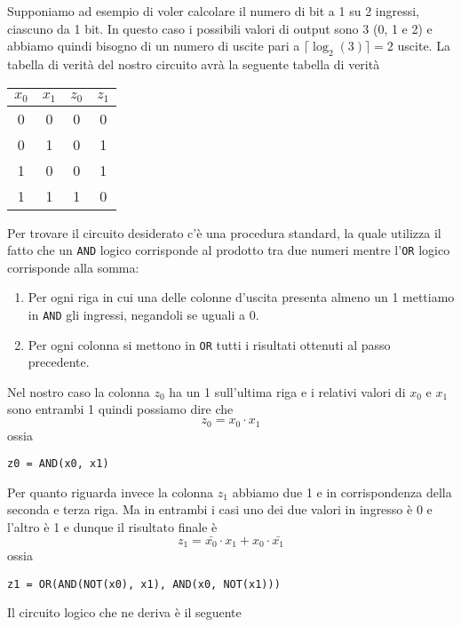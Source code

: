 Supponiamo ad esempio di voler calcolare il numero di bit a 1 su 2 ingressi, ciascuno da 1 bit. In
questo caso i possibili valori di output sono 3 (0, 1 e 2) e abbiamo quindi bisogno di un numero
di uscite pari a $\lceil \log_2 (3) \rceil = 2$ uscite. La tabella di verità del nostro circuito
avrà la seguente tabella di verità
\begin{center}
	\begin{tabular}{c c | c c}
		$x_0$ & $x_1$ & $z_0$ & $z_1$ \\ \hline
		0     & 0     & 0     & 0     \\
		0     & 1     & 0     & 1     \\
		1     & 0     & 0     & 1     \\
		1     & 1     & 1     & 0
	\end{tabular}
\end{center}
Per trovare il circuito desiderato c'è una procedura standard, la quale utilizza il fatto che un
\verb|AND| logico corrisponde al prodotto tra due numeri mentre l'\verb|OR| logico corrisponde alla
somma:
\begin{enumerate}
	\item Per ogni riga in cui una delle colonne d'uscita presenta almeno un 1 mettiamo in
	      \verb|AND| gli ingressi, negandoli se uguali a 0.
	\item Per ogni colonna si mettono in \verb|OR| tutti i risultati ottenuti al passo precedente.
\end{enumerate}
Nel nostro caso la colonna $z_0$ ha un 1 sull'ultima riga e i relativi valori di $x_0$ e $x_1$ sono
entrambi 1 quindi possiamo dire che
\[ z_0 = x_0 \cdot x_1 \]
ossia
\begin{center}
	\verb|z0 = AND(x0, x1)|
\end{center}
Per quanto riguarda invece la colonna $z_1$ abbiamo due 1 e in corrispondenza della seconda e terza
riga. Ma in entrambi i casi uno dei due valori in ingresso è 0 e l'altro è 1 e dunque il risultato
finale è
\[ z_1 = \bar{x_0} \cdot x_1 + x_0 \cdot \bar{x_1} \]
ossia
\begin{center}
	\verb|z1 = OR(AND(NOT(x0), x1), AND(x0, NOT(x1)))|
\end{center}
Il circuito logico che ne deriva è il seguente



